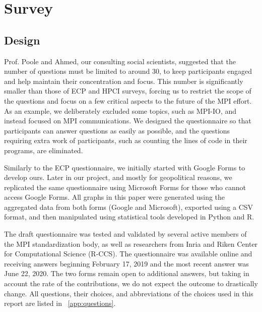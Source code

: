\documentclass[preprint,5p,times]{elsarticle}
\newcommand{\revision}[2]{{\color{blue}#2}}
\begin{document}
\section{Survey}

\subsection*{Design}
%
\revision{The social scientists}{Prof. Poole and Ahmed, our consulting social
scientists,} suggested that the number of questions must be
limited \revision{}{to}
around 30, to keep participants engaged and help maintain their concentration and
focus. This number is significantly smaller than those of ECP and HPCI surveys,
forcing us to restrict the scope of the questions and focus on a few critical
aspects to the future of the MPI effort. As an example, we deliberately excluded
some topics, such as MPI-IO, and instead focused on MPI communications.
We designed the questionnaire so that participants can answer questions
as easily as possible, and the questions requiring extra work of participants, such as counting the lines of code in their programs, are eliminated.

Similarly to the ECP questionnaire, we initially started with Google Forms to
develop ours. Later in our project, and mostly for geopolitical reasons, we
replicated the same questionnaire using Microsoft Forms for those who cannot
access Google Forms. All graphs in this paper were generated using the
aggregated data from both forms (Google and Microsoft), exported using a CSV
format, and then manipulated using statistical tools developed in Python and R.

The draft questionnaire was tested and validated by several active members of
the MPI standardization body, as well as researchers from Inria and Riken Center
for Computational Science (R-CCS).
\revision{}{
The questionnaire was available online and receiving answers beginning February
17, 2019 and the most recent answer was June 22, 2020. The two forms remain open to additional
answers, but taking in account the rate of the contributions, we do not expect
the outcome to drastically change.}
All questions, their choices, and abbreviations of the choices used in
this report are listed in ~\ref{app:questions}.
\end{document}
